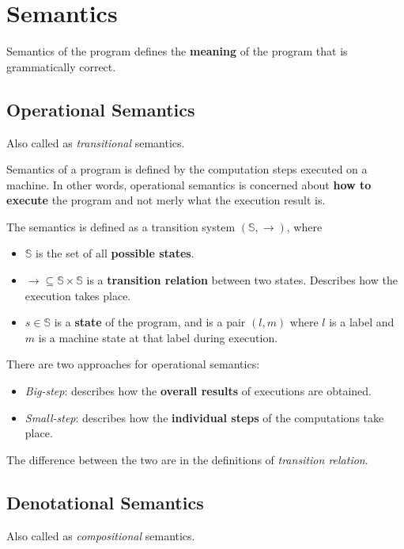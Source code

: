 \documentclass[12pt, twopage]{book}
\begin{document}
\section{Semantics}
\label{sec:semantics}

Semantics of the program defines the \textbf{meaning} of the program
that is grammatically correct.

\subsection{Operational Semantics}

Also called as \textit{transitional} semantics.

Semantics of a program is defined by the computation steps executed on
a machine. In other words, operational semantics is concerned about
\textbf{how to execute} the program and not merly what the execution
result is.

The semantics is defined as a transition system
$ ( \mathbb{S}, \to ) $, where

\begin{itemize}
\item $ \mathbb{S} $ is the set of all \textbf{possible states}.
\item $ \to \subseteq \mathbb{S} \times \mathbb{S} $ is a
  \textbf{transition relation} between two states. Describes how the
  execution takes place.
\item $ s \in \mathbb{S} $ is a \textbf{state} of the program, and is
  a pair $ ( l, m ) $ where $ l $ is a label and $ m $ is a machine
  state at that label during execution.
\end{itemize}

There are two approaches for operational semantics:

\begin{itemize}
\item \textsl{Big-step}: describes how the \textbf{overall results} of
  executions are obtained.
\item \textsl{Small-step}: describes how the \textbf{individual steps}
  of the computations take place.
\end{itemize}


The difference between the two are in the definitions of
\textsl{transition relation}.


\subsection{Denotational Semantics}
Also called as \textit{compositional} semantics.
\end{document}
